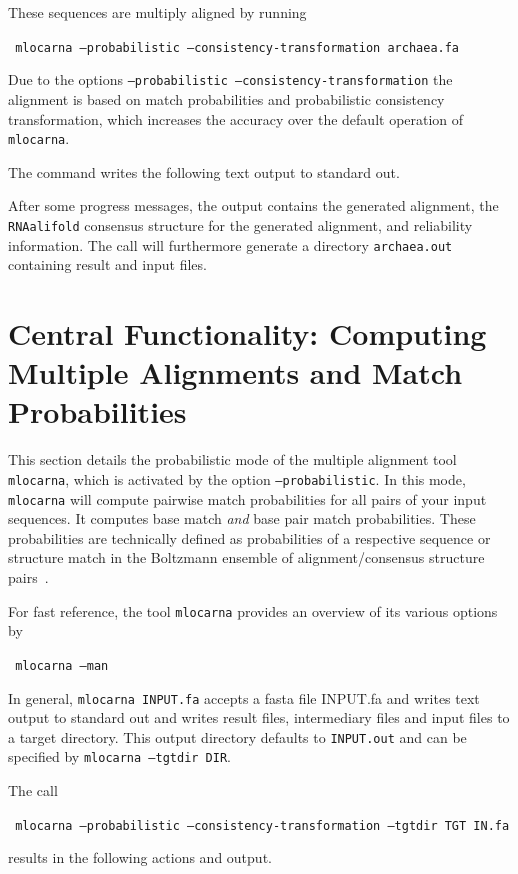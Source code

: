 \documentclass{article}
\newenvironment{ttbox}{%
  \begin{framed}\begin{minipage}{1.0\textwidth}\tt}%
{\end{minipage}\end{framed}}
\begin{document}
These sequences are multiply aligned by running
\begin{ttbox}
  mlocarna --probabilistic --consistency-transformation archaea.fa
\end{ttbox}
Due to the options \texttt{--probabilistic
  --consistency-transformation} the alignment is based on match
probabilities and probabilistic consistency transformation, which increases the accuracy over the default operation of \texttt{mlocarna}.

The command writes the following text output to standard out.
\begin{framed}
  
\end{framed}

After some progress messages, the output contains the generated
alignment, the \texttt{RNAalifold} consensus structure for the
generated alignment, and reliability information.  The call will
furthermore generate a directory \texttt{archaea.out} containing
result and input files.


\section{Central Functionality: Computing Multiple Alignments and
  Match Probabilities}

This section details the probabilistic mode of the multiple alignment
tool \texttt{mlocarna}, which is activated by the option
\texttt{--probabilistic}.
%
In this mode, \texttt{mlocarna} will compute pairwise match
probabilities for all pairs of your input sequences. It computes base
match \emph{and} base pair match probabilities. These probabilities
are technically defined as probabilities of a respective sequence or
structure match in the Boltzmann ensemble of alignment/consensus
structure pairs~\cite{Will:LocARNAP:unpublished}.

For fast reference, the tool \texttt{mlocarna} provides an overview of
its various options by
\begin{ttbox}
  mlocarna --man
\end{ttbox}

In general, \texttt{mlocarna INPUT.fa} accepts a fasta file INPUT.fa
and writes text output to standard out and writes result files,
intermediary files and input files to a target directory. This output
directory defaults to \texttt{INPUT.out} and can be specified by
\texttt{mlocarna --tgtdir DIR}.

The call
\begin{ttbox}
  mlocarna --probabilistic --consistency-transformation --tgtdir TGT IN.fa 
\end{ttbox}
results in the following actions and output.
\end{document}
